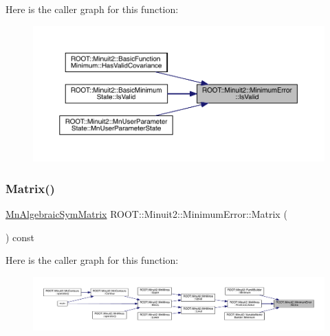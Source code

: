 Here is the caller graph for this function\+:\nopagebreak
\begin{figure}[H]
\begin{center}
\leavevmode
\includegraphics[width=350pt]{d5/d32/classROOT_1_1Minuit2_1_1MinimumError_a0e9a9c525f7ac2e5dc5c7973056a852b_icgraph}
\end{center}
\end{figure}
\mbox{\label{classROOT_1_1Minuit2_1_1MinimumError_a7065d453e2892ed1c25b7f28d0c1aa66}} 
\subsubsection{\texorpdfstring{Matrix()}{Matrix()}\hspace{0.1cm}{\footnotesize\ttfamily [1/2]}}
{\footnotesize\ttfamily \mbox{\hyperlink{namespaceROOT_1_1Minuit2_a9e74ad97f5537a2e80e52b04d98ecc6e}{Mn\+Algebraic\+Sym\+Matrix}} R\+O\+O\+T\+::\+Minuit2\+::\+Minimum\+Error\+::\+Matrix (\begin{DoxyParamCaption}{ }\end{DoxyParamCaption}) const\hspace{0.3cm}{\ttfamily [inline]}}

Here is the caller graph for this function\+:\nopagebreak
\begin{figure}[H]
\begin{center}
\leavevmode
\includegraphics[width=350pt]{d5/d32/classROOT_1_1Minuit2_1_1MinimumError_a7065d453e2892ed1c25b7f28d0c1aa66_icgraph}
\end{center}
\end{figure}
\mbox{\label{classROOT_1_1Minuit2_1_1MinimumError_a7065d453e2892ed1c25b7f28d0c1aa66}} 
